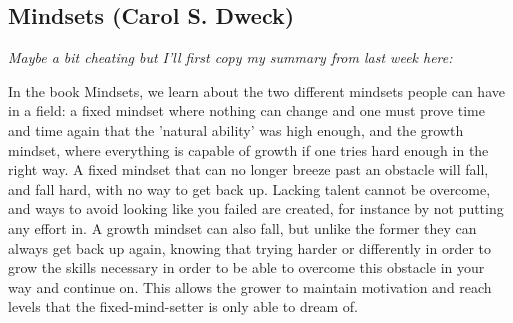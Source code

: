 \subsection{Mindsets (Carol S. Dweck) \label{mindsets}}

\textit{Maybe a bit cheating but I'll first copy my summary from last week here:}

In the book Mindsets, we learn about the two different mindsets people can have in a field: a fixed mindset where nothing can change and one must prove time and time again that the 'natural ability' was high enough, and the growth mindset, where everything is capable of growth if one tries hard enough in the right way.
A fixed mindset that can no longer breeze past an obstacle will fall, and fall hard, with no way to get back up.
Lacking talent cannot be overcome, and ways to avoid looking like you failed are created, for instance by not putting any effort in.
A growth mindset can also fall, but unlike the former they can always get back up again, knowing that trying harder or differently in order to grow the skills necessary in order to be able to overcome this obstacle in your way and continue on.
This allows the grower to maintain motivation and reach levels that the fixed-mind-setter is only able to dream of.
